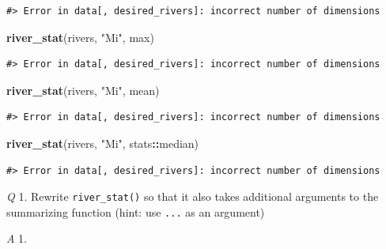 \documentclass[
]{book}
\newenvironment{Shaded}{\begin{snugshade}}{\end{snugshade}}
\newcommand{\KeywordTok}[1]{\textcolor[rgb]{0.13,0.29,0.53}{\textbf{#1}}}
\newcommand{\NormalTok}[1]{#1}
\newcommand{\OperatorTok}[1]{\textcolor[rgb]{0.81,0.36,0.00}{\textbf{#1}}}
\newcommand{\StringTok}[1]{\textcolor[rgb]{0.31,0.60,0.02}{#1}}
\begin{document}
\begin{verbatim}
#> Error in data[, desired_rivers]: incorrect number of dimensions
\end{verbatim}

\begin{Shaded}
\begin{Highlighting}[]
\KeywordTok{river_stat}\NormalTok{(rivers, }\StringTok{"Mi"}\NormalTok{, max)}
\end{Highlighting}
\end{Shaded}

\begin{verbatim}
#> Error in data[, desired_rivers]: incorrect number of dimensions
\end{verbatim}

\begin{Shaded}
\begin{Highlighting}[]
\KeywordTok{river_stat}\NormalTok{(rivers, }\StringTok{"Mi"}\NormalTok{, mean)}
\end{Highlighting}
\end{Shaded}

\begin{verbatim}
#> Error in data[, desired_rivers]: incorrect number of dimensions
\end{verbatim}

\begin{Shaded}
\begin{Highlighting}[]
\KeywordTok{river_stat}\NormalTok{(rivers, }\StringTok{"Mi"}\NormalTok{, stats}\OperatorTok{::}\NormalTok{median)}
\end{Highlighting}
\end{Shaded}

\begin{verbatim}
#> Error in data[, desired_rivers]: incorrect number of dimensions
\end{verbatim}

\emph{Q} 1. Rewrite \texttt{river\_stat()} so that it also takes additional arguments to the summarizing function (hint: use \texttt{...} as an argument)

\emph{A} 1.
\end{document}
